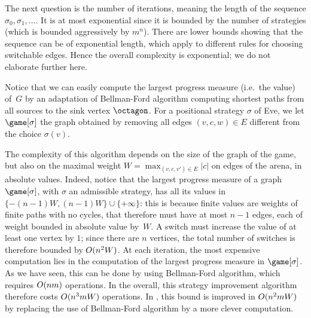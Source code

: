 The next question is the number of iterations, meaning the length of the sequence
$\sigma_0,\sigma_1,\dots$. It is at most exponential since it is bounded by the number of strategies (which is bounded aggressively by $m^n$).
There are lower bounds showing that the sequence can be of exponential length, which apply to different rules for choosing switchable edges.
Hence the overall complexity is exponential; we do not elaborate further here. 


Notice that we can easily compute the largest progress measure
(i.e.~the value) of~$G$ by an adaptation of Bellman-Ford algorithm
computing shortest paths from all sources to the sink vertex
$\octagon$. For a positional strategy $\sigma$ of Eve, we let
$\game[\sigma]$ the graph obtained by removing all edges
$(v,c,w)\in E$ different from the choice $\sigma(v)$. 


The complexity of this algorithm depends on the size of the graph of
the game, but also on the maximal weight
$W = \max_{(v,c,v')\in E} |c|$ on edges of the arena, in absolute
values. Indeed, notice that the largest progress measure of a graph
$\game[\sigma]$, with $\sigma$ an admissible strategy, has all its
values in $\{-(n-1)W,(n-1)W\}\cup\{+\infty\}$: this is because
finite values are weights of finite paths with no cycles, that
therefore must have at most $n-1$ edges, each of weight bounded in
absolute value by~$W$. A switch must increase the value of at
least one vertex by $1$; since there are $n$ vertices, the total
number of switches is therefore bounded by $O(n^2W)$. At
each iteration, the most expensive computation lies in the computation
of the largest progress measure in $\game[\sigma]$. As we have seen,
this can be done by using Bellman-Ford algorithm, which requires
$O(nm)$ operations. In the overall, this strategy
improvement algorithm therefore costs $O(n^3mW)$
operations. In \cite[Section 6]{Bjorklund&Vorobyov:2007}, this bound
is improved in $O(n^2 mW)$ by replacing the use of
Bellman-Ford algorithm by a more clever computation.

